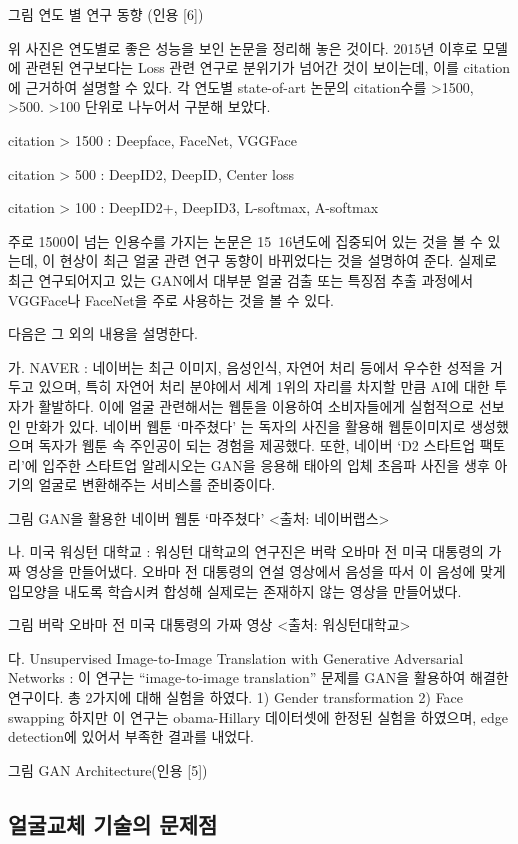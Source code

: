 \documentclass{oblivoir}
\begin{document}
그림  연도 별 연구 동향 (인용 [6])

위 사진은 연도별로 좋은 성능을 보인 논문을 정리해 놓은 것이다. 2015년 이후로 모델에 관련된 연구보다는 Loss 관련 연구로 분위기가 넘어간 것이 보이는데, 이를 citation에 근거하여 설명할 수 있다. 각 연도별 state-of-art 논문의 citation수를 >1500, >500. >100 단위로 나누어서 구분해 보았다. 

citation > 1500 : Deepface, FaceNet, VGGFace

citation > 500  : DeepID2, DeepID, Center loss

citation > 100  : DeepID2+, DeepID3, L-softmax, A-softmax

주로 1500이 넘는 인용수를 가지는 논문은 15~16년도에 집중되어 있는 것을 볼 수 있는데, 이 현상이 최근 얼굴 관련 연구 동향이 바뀌었다는 것을 설명하여 준다. 실제로 최근 연구되어지고 있는 GAN에서 대부분 얼굴 검출 또는 특징점 추출 과정에서 VGGFace나 FaceNet을 주로 사용하는 것을 볼 수 있다. 

다음은 그 외의 내용을 설명한다.

가. NAVER : 네이버는 최근 이미지, 음성인식, 자연어 처리 등에서 우수한 성적을 거두고 있으며, 특히 자연어 처리 분야에서 세계 1위의 자리를 차지할 만큼 AI에 대한 투자가 활발하다. 이에 얼굴 관련해서는 웹툰을 이용하여 소비자들에게 실험적으로 선보인 만화가 있다. 네이버 웹툰 ‘마주쳤다’ 는 독자의 사진을 활용해 웹툰이미지로 생성했으며 독자가 웹툰 속 주인공이 되는 경험을 제공했다. 또한, 네이버 ‘D2 스타트업 팩토리’에 입주한 스타트업 알레시오는 GAN을 응용해 태아의 입체 초음파 사진을 생후 아기의 얼굴로 변환해주는 서비스를 준비중이다.

그림  GAN을 활용한 네이버 웹툰 ‘마주쳤다’ <출처: 네이버랩스>

나. 미국 워싱턴 대학교 : 워싱턴 대학교의 연구진은 버락 오바마 전 미국 대통령의 가짜 영상을 만들어냈다. 오바마 전 대통령의 연설 영상에서 음성을 따서 이 음성에 맞게 입모양을 내도록 학습시켜 합성해 실제로는 존재하지 않는 영상을 만들어냈다. 

그림  버락 오바마 전 미국 대통령의 가짜 영상 <출처: 워싱턴대학교>

다. Unsupervised Image-to-Image Translation with Generative Adversarial Networks : 이 연구는 “image-to-image translation” 문제를 GAN을 활용하여 해결한 연구이다. 총 2가지에 대해 실험을 하였다. 1) Gender transformation 2) Face swapping 하지만 이 연구는 obama-Hillary 데이터셋에 한정된 실험을 하였으며, edge detection에 있어서 부족한 결과를 내었다.

그림  GAN Architecture(인용 [5])

\subsection{얼굴교체 기술의 문제점}
\end{document}
